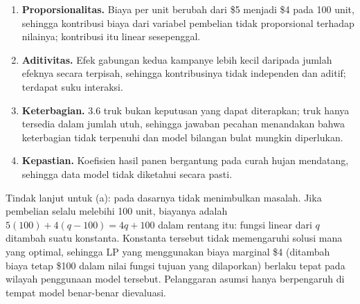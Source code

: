 \begin{enumerate}
\item \textbf{Proporsionalitas.} Biaya per unit berubah dari \$5 menjadi \$4 pada 100 unit, sehingga kontribusi biaya dari variabel pembelian tidak proporsional terhadap nilainya; kontribusi itu linear sesepenggal.
\item \textbf{Aditivitas.} Efek gabungan kedua kampanye lebih kecil daripada jumlah efeknya secara terpisah, sehingga kontribusinya tidak independen dan aditif; terdapat suku interaksi.
\item \textbf{Keterbagian.} 3.6 truk bukan keputusan yang dapat diterapkan; truk hanya tersedia dalam jumlah utuh, sehingga jawaban pecahan menandakan bahwa keterbagian tidak terpenuhi dan model bilangan bulat mungkin diperlukan.
\item \textbf{Kepastian.} Koefisien hasil panen bergantung pada curah hujan mendatang, sehingga data model tidak diketahui secara pasti.
\end{enumerate}
Tindak lanjut untuk (a): pada dasarnya tidak menimbulkan masalah. Jika pembelian selalu melebihi 100 unit, biayanya adalah $5(100) + 4(q - 100) = 4q + 100$ dalam rentang itu: fungsi linear dari $q$ ditambah suatu konstanta. Konstanta tersebut tidak memengaruhi solusi mana yang optimal, sehingga LP yang menggunakan biaya marginal \$4 (ditambah biaya tetap \$100 dalam nilai fungsi tujuan yang dilaporkan) berlaku tepat pada wilayah penggunaan model tersebut. Pelanggaran asumsi hanya berpengaruh di tempat model benar-benar dievaluasi.


